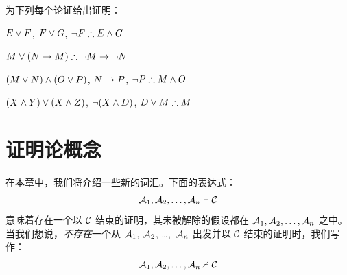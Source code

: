 \begin{compactlist}
\item\begin{fitchproof}
 {}
 {}
\end{fitchproof}
\item\begin{fitchproof}
\open
\close
{}
\end{fitchproof}
\item\begin{fitchproof}
\open
	 {}
		\open
	\close
\close
{}
\end{fitchproof}
\end{compactlist}

\problempart
为下列每个论证给出证明：

\begin{compactlist}
\item $E\vee F$, $F\vee G$, $\enot F \therefore E \eand G$
\item $M\eor(N\eif M) \therefore \enot M \eif \enot N$
\item $(M \vee N) \wedge (O \vee P)$, $N \rightarrow P$, $\enot P \therefore M\eand O$
\item $(X\wedge Y)\vee(X\wedge Z)$, $\neg(X\wedge D)$, $D\eor M \therefore M$
\end{compactlist}

\chapter{证明论概念}\label{s:ProofTheoreticConcepts}

在本章中，我们将介绍一些新的词汇。下面的表达式：
$$\mathcal{A}_1, \mathcal{A}_2, \ldots, \mathcal{A}_n \vdash \mathcal{C}$$
意味着存在一个以 $\mathcal{C}$ 结束的证明，其未被解除的假设都在 $\mathcal{A}_1, \mathcal{A}_2, \ldots, \mathcal{A}_n$ 之中。当我们想说，\emph{不存在}一个从 $\mathcal{A}_1$, $\mathcal{A}_2$, \dots,~$\mathcal{A}_n$ 出发并以 $\mathcal{C}$ 结束的证明时，我们写作：  $$\mathcal{A}_1, \mathcal{A}_2, \ldots, \mathcal{A}_n \nvdash \mathcal{C}$$


